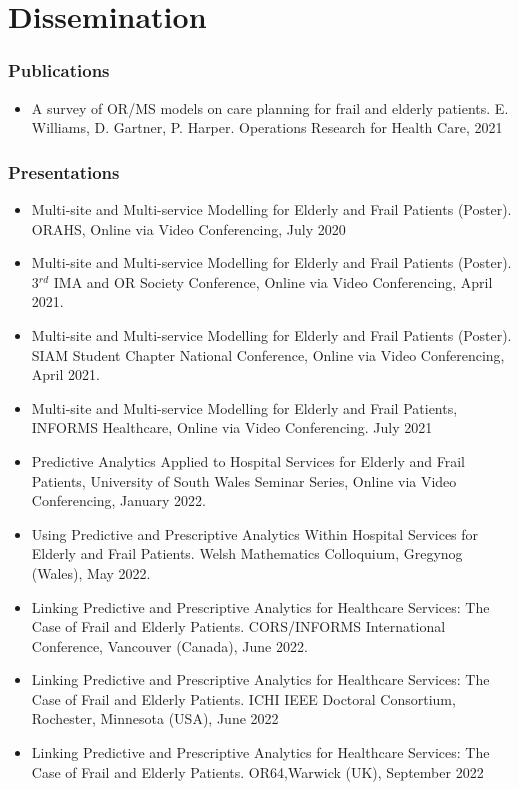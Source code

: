 \documentclass[../thesis.tex]{subfiles}
\begin{document}
\chapter*{Dissemination}
\subsection*{Publications}
\begin{itemize}
    \item A survey of OR/MS models on care planning for frail and elderly patients. E. Williams, D. Gartner, P. Harper. Operations Research for Health Care, 2021 \cite{Williams2021}
\end{itemize}



\subsection*{Presentations}
\begin{itemize}
    \item Multi-site and Multi-service Modelling for Elderly and Frail Patients (Poster). ORAHS, Online via Video Conferencing, July 2020
    \item Multi-site and Multi-service Modelling for Elderly and Frail Patients (Poster). 3$^{rd}$ IMA and OR Society Conference, Online via Video Conferencing, April 2021.
    \item Multi-site and Multi-service Modelling for Elderly and Frail Patients (Poster). SIAM Student Chapter National Conference, Online via Video Conferencing, April 2021.
    \item Multi-site and Multi-service Modelling for Elderly and Frail Patients, INFORMS Healthcare, Online via Video Conferencing. July 2021
    \item Predictive Analytics Applied to Hospital Services for Elderly and Frail Patients, University of South Wales Seminar Series, Online via Video Conferencing, January 2022.
    \item Using Predictive and Prescriptive Analytics Within Hospital Services for Elderly and Frail Patients. Welsh Mathematics Colloquium, Gregynog (Wales), May 2022.
    \item Linking Predictive and Prescriptive Analytics for Healthcare Services: The Case of Frail and Elderly Patients. CORS/INFORMS International Conference, Vancouver (Canada), June 2022.
    \item Linking Predictive and Prescriptive Analytics for Healthcare Services: The Case of Frail and Elderly Patients. ICHI IEEE Doctoral Consortium, Rochester, Minnesota (USA), June 2022
    \item Linking Predictive and Prescriptive Analytics for Healthcare Services: The Case of Frail and Elderly Patients. OR64,Warwick (UK), September 2022 
\end{itemize}
\vfill
\end{document}
